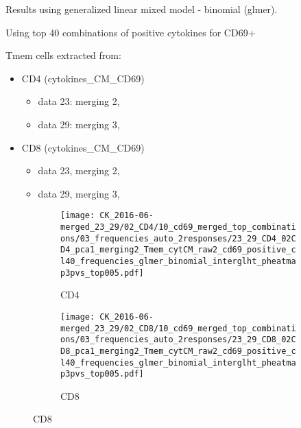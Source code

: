 \documentclass[a4paper, 12pt]{article}
\begin{document}
\pagestyle{empty}


Results using generalized linear mixed model - binomial (glmer).

Using top 40 combinations of positive cytokines for CD69+

Tmem cells extracted from:
\begin{itemize}
  \item  CD4 (cytokines\_CM\_CD69)
      \begin{itemize}
      \item data 23: merging 2, 
      \item data 29: merging 3,
    \end{itemize}

  \item  CD8 (cytokines\_CM\_CD69)
  \begin{itemize}
  \item data 23, merging 2,
  \item data 29, merging 3, 
\end{itemize}
  
\end{itemize}


\begin{figure}[!thb]
\centering

    \begin{subfigure}[t]{0.02\textwidth}
    \vskip 0pt
        \textbf{\textsf{\normalsize }}
    \end{subfigure}
    \begin{subfigure}[t]{0.45\textwidth}
    \vskip 0pt
    \caption{CD4}
        \texttt{[image: CK\_2016-06-merged\_23\_29/02\_CD4/10\_cd69\_merged\_top\_combinations/03\_frequencies\_auto\_2responses/23\_29\_CD4\_02CD4\_pca1\_merging2\_Tmem\_cytCM\_raw2\_cd69\_positive\_cl40\_frequencies\_glmer\_binomial\_interglht\_pheatmap3pvs\_top005.pdf]}
    \end{subfigure}
\quad
    \begin{subfigure}[t]{0.02\textwidth}
    \vskip 0pt
        \textbf{\textsf{\normalsize }}
    \end{subfigure}
    \begin{subfigure}[t]{0.45\textwidth}
    \vskip 0pt
    \caption{CD8}
        \texttt{[image: CK\_2016-06-merged\_23\_29/02\_CD8/10\_cd69\_merged\_top\_combinations/03\_frequencies\_auto\_2responses/23\_29\_CD8\_02CD8\_pca1\_merging2\_Tmem\_cytCM\_raw2\_cd69\_positive\_cl40\_frequencies\_glmer\_binomial\_interglht\_pheatmap3pvs\_top005.pdf]}
    \end{subfigure}
    
    
\end{figure}
\end{document}
